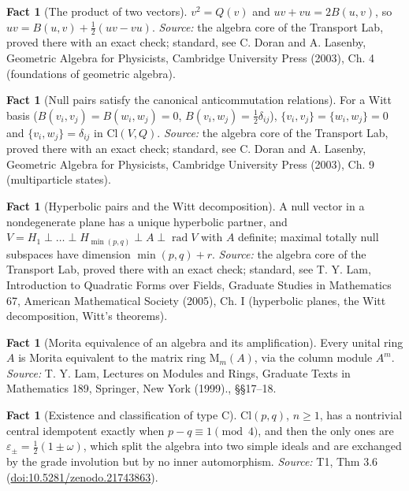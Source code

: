 \documentclass[11pt]{article}
\theoremstyle{definition}
\newtheorem{fact}[theorem]{Fact}
\theoremstyle{plain}
\providecommand{\Cl}{}\renewcommand{\Cl}{\mathrm{Cl}}
\providecommand{\Mat}{}\renewcommand{\Mat}{\mathrm{M}}
\begin{document}
\begin{fact}[The product of two vectors]\label{c:std-algebra.vector-squares}
$v^{2} = Q(v)$ and $uv + vu = 2B(u, v)$, so $uv = B(u, v) + \tfrac12(uv - vu)$.
\emph{Source:} the algebra core of the Transport Lab, proved there with an exact check; standard, see C. Doran and A. Lasenby, Geometric Algebra for Physicists, Cambridge University Press (2003), Ch. 4 (foundations of geometric algebra).
\end{fact}

\begin{fact}[Null pairs satisfy the canonical anticommutation relations]\label{c:std-algebra.witt-basis-car}
For a Witt basis ($B(v_i,v_j) = B(w_i,w_j) = 0$, $B(v_i,w_j) = \tfrac12\delta_{ij}$), $\{v_i,v_j\} = \{w_i,w_j\} = 0$ and $\{v_i,w_j\} = \delta_{ij}$ in $\Cl(V,Q)$.
\emph{Source:} the algebra core of the Transport Lab, proved there with an exact check; standard, see C. Doran and A. Lasenby, Geometric Algebra for Physicists, Cambridge University Press (2003), Ch. 9 (multiparticle states).
\end{fact}

\begin{fact}[Hyperbolic pairs and the Witt decomposition]\label{c:std-algebra.witt-decomposition}
A null vector in a nondegenerate plane has a unique hyperbolic partner, and $V = H_1 \perp \dots \perp H_{\min(p,q)} \perp A \perp \operatorname{rad} V$ with $A$ definite; maximal totally null subspaces have dimension $\min(p,q) + r$.
\emph{Source:} the algebra core of the Transport Lab, proved there with an exact check; standard, see T. Y. Lam, Introduction to Quadratic Forms over Fields, Graduate Studies in Mathematics 67, American Mathematical Society (2005), Ch. I (hyperbolic planes, the Witt decomposition, Witt's theorems).
\end{fact}

\begin{fact}[Morita equivalence of an algebra and its amplification]\label{c:tower.morita-equivalence-algebra-amplification}
Every unital ring $A$ is Morita equivalent to the matrix ring $\Mat_m(A)$, via the column module $A^m$.
\emph{Source:} T. Y. Lam, Lectures on Modules and Rings, Graduate Texts in Mathematics 189, Springer, New York (1999)., \S\S 17--18.
\end{fact}

\begin{fact}[Existence and classification of type C]\label{c:transport.existence-classification-type-c}
$\Cl(p,q)$, $n \geq 1$, has a nontrivial central idempotent exactly when $p - q \equiv 1 \pmod 4$, and then the only ones are $\varepsilon_\pm = \tfrac12(1 \pm \omega)$, which split the algebra into two simple ideals and are exchanged by the grade involution but by no inner automorphism.
\emph{Source:} T1, Thm 3.6 (\href{https://doi.org/10.5281/zenodo.21743863}{doi:10.5281/zenodo.21743863}).
\end{fact}
\end{document}
